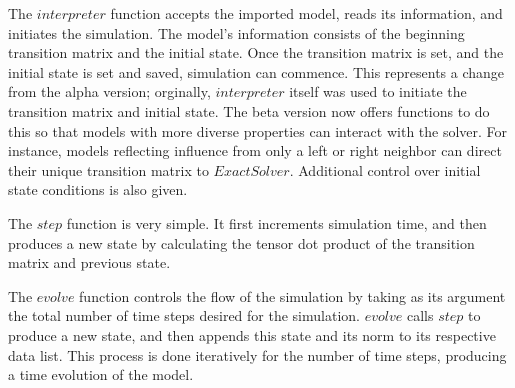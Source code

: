 The $interpreter$ function accepts the imported model, reads its information, and initiates the simulation. The model's information consists of the beginning transition matrix and the initial state. Once the transition matrix is set, and the initial state is set and saved, simulation can commence. This represents a change from the alpha version; orginally, $interpreter$ itself was used to initiate the transition matrix and initial state. The beta version now offers functions to do this so that models with more diverse properties can interact with the solver. For instance, models reflecting influence from only a left or right neighbor can direct their unique transition matrix to $ExactSolver$. Additional control over initial state conditions is also given.

The $step$ function is very simple. It first increments simulation time, and then produces a new state by calculating the tensor dot product of the transition matrix and previous state.

The $evolve$ function controls the flow of the simulation by taking as its argument the total number of time steps desired for the simulation. $evolve$ calls $step$ to produce a new state, and then appends this state and its norm to its respective data list. This process is done iteratively for the number of time steps, producing a time evolution of the model. 
